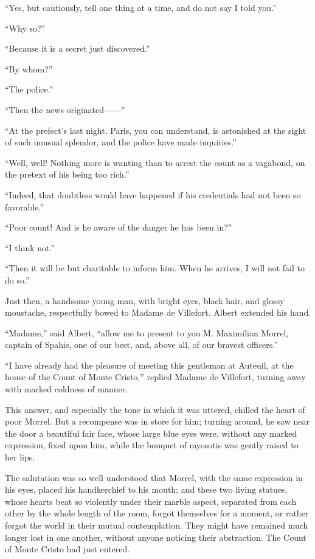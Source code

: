 “Yes, but cautiously, tell one thing at a time, and do not say I told
you.”

“Why so?”

“Because it is a secret just discovered.”

“By whom?”

“The police.”

“Then the news originated——”

“At the prefect’s last night. Paris, you can understand, is astonished
at the sight of such unusual splendor, and the police have made
inquiries.”

“Well, well! Nothing more is wanting than to arrest the count as a
vagabond, on the pretext of his being too rich.”

“Indeed, that doubtless would have happened if his credentials had not
been so favorable.”

“Poor count! And is he aware of the danger he has been in?”

“I think not.”

“Then it will be but charitable to inform him. When he arrives, I will
not fail to do so.”

Just then, a handsome young man, with bright eyes, black hair, and
glossy moustache, respectfully bowed to Madame de Villefort. Albert
extended his hand.

“Madame,” said Albert, “allow me to present to you M. Maximilian
Morrel, captain of Spahis, one of our best, and, above all, of our
bravest officers.”

“I have already had the pleasure of meeting this gentleman at Auteuil,
at the house of the Count of Monte Cristo,” replied Madame de
Villefort, turning away with marked coldness of manner.

This answer, and especially the tone in which it was uttered, chilled
the heart of poor Morrel. But a recompense was in store for him;
turning around, he saw near the door a beautiful fair face, whose large
blue eyes were, without any marked expression, fixed upon him, while
the bouquet of myosotis was gently raised to her lips.

The salutation was so well understood that Morrel, with the same
expression in his eyes, placed his handkerchief to his mouth; and these
two living statues, whose hearts beat so violently under their marble
aspect, separated from each other by the whole length of the room,
forgot themselves for a moment, or rather forgot the world in their
mutual contemplation. They might have remained much longer lost in one
another, without anyone noticing their abstraction. The Count of Monte
Cristo had just entered.

